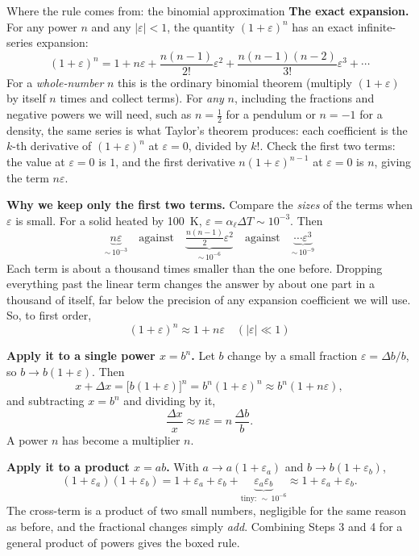 \begin{derivbox}{Where the rule comes from: the binomial approximation}
 \textbf{The exact expansion.} For any power $n$ and any $|\varepsilon|<1$, the quantity
$(1+\varepsilon)^n$ has an exact infinite-series expansion:
\[
(1+\varepsilon)^n = 1 + n\varepsilon + \frac{n(n-1)}{2!}\varepsilon^2
+ \frac{n(n-1)(n-2)}{3!}\varepsilon^3 + \cdots
\]
For a \emph{whole-number} $n$ this is the ordinary binomial theorem (multiply $(1+\varepsilon)$ by
itself $n$ times and collect terms). For \emph{any} $n$, including the fractions and negative powers we
will need, such as $n=\tfrac12$ for a pendulum or $n=-1$ for a density, the same series is what
Taylor's theorem produces: each coefficient is the $k$-th derivative of $(1+\varepsilon)^n$ at
$\varepsilon=0$, divided by $k!$. Check the first two terms: the value at $\varepsilon=0$ is $1$, and
the first derivative $n(1+\varepsilon)^{n-1}$ at $\varepsilon=0$ is $n$, giving the term $n\varepsilon$.

 \textbf{Why we keep only the first two terms.} Compare the \emph{sizes} of the terms when
$\varepsilon$ is small. For a solid heated by \SI{100}{K}, $\varepsilon = \alpha_\ell\Delta T \sim
10^{-3}$. Then
\[
\underbrace{n\varepsilon}_{\sim\,10^{-3}} \quad\text{against}\quad
\underbrace{\tfrac{n(n-1)}{2}\varepsilon^2}_{\sim\,10^{-6}} \quad\text{against}\quad
\underbrace{\cdots\varepsilon^3}_{\sim\,10^{-9}}
\]
Each term is about a thousand times smaller than the one before. Dropping everything past the linear
term changes the answer by about one part in a thousand of itself, far below the precision of any
expansion coefficient we will use. So, to first order,
\[
\boxed{\;(1+\varepsilon)^n \approx 1 + n\varepsilon \quad (|\varepsilon| \ll 1)\;}
\]

 \textbf{Apply it to a single power $x=b^n$.} Let $b$ change by a small fraction
$\varepsilon = \Delta b/b$, so $b \to b(1+\varepsilon)$. Then
\[
x + \Delta x = \bigl[b(1+\varepsilon)\bigr]^n = b^n(1+\varepsilon)^n \approx b^n(1 + n\varepsilon),
\]
and subtracting $x=b^n$ and dividing by it,
\[
\frac{\Delta x}{x} \approx n\varepsilon = n\,\frac{\Delta b}{b}.
\]
A power $n$ has become a multiplier $n$.

 \textbf{Apply it to a product $x=ab$.} With $a\to a(1+\varepsilon_a)$ and
$b\to b(1+\varepsilon_b)$,
\[
(1+\varepsilon_a)(1+\varepsilon_b) = 1 + \varepsilon_a + \varepsilon_b
+ \underbrace{\varepsilon_a\varepsilon_b}_{\text{tiny: }\sim\,10^{-6}}
\approx 1 + \varepsilon_a + \varepsilon_b .
\]
The cross-term is a product of two small numbers, negligible for the same reason as before, and the
fractional changes simply \emph{add}. Combining Steps 3 and 4 for a general product of powers gives the
boxed rule.
\end{derivbox}

